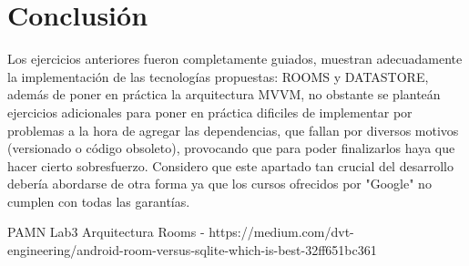 \documentclass{article}
\begin{document}
    \section{Conclusión}
    Los ejercicios anteriores fueron completamente guiados, muestran adecuadamente la 
     implementación de las tecnologías propuestas: ROOMS y DATASTORE, además de poner
     en práctica la arquitectura MVVM, no obstante se planteán ejercicios adicionales
     para poner en práctica dificiles de implementar por problemas a la hora de agregar
     las dependencias, que fallan por diversos motivos (versionado o código obsoleto),
     provocando que para poder finalizarlos haya que hacer cierto sobresfuerzo.
     Considero que este apartado tan crucial del desarrollo debería abordarse de otra
     forma ya que los cursos ofrecidos por "Google" no cumplen con todas las garantías.

    \begin{thebibliography}{}
         PAMN Lab3 Arquitectura
         Rooms - https://medium.com/dvt-engineering/android-room-versus-sqlite-which-is-best-32ff651bc361
    \end{thebibliography}
        
\end{document}
